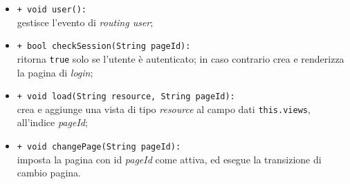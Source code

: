 \begin{flushleft}
\begin{itemize}
\begin{sloppypar}
\begin{itemize}
\item \texttt{+ void user():}\\ gestisce l'evento di \textit{routing user};
\item \texttt{+ bool checkSession(String pageId):}\\ ritorna \texttt{true} solo se l'utente è autenticato; in caso contrario crea e renderizza la pagina di \textit{login};
\item \texttt{+ void load(String resource, String pageId):}\\ crea e aggiunge una vista di tipo \textit{resource} al campo dati \texttt{this.views}, all'indice \textit{pageId};
\item \texttt{+ void changePage(String pageId):}\\ imposta la pagina con id \textit{pageId} come attiva, ed esegue la transizione di cambio pagina.
\end{itemize}
\end{sloppypar}
\end{itemize}
\end{flushleft}

